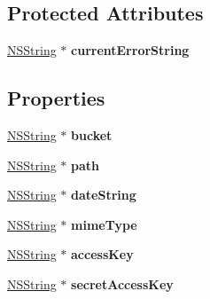 \subsection*{Protected Attributes}
\begin{DoxyCompactItemize}
\item 
\hypertarget{interface_a_s_i_s3_request_ae5a445cc590bdb2138a54c4b4b6544ea}{
\hyperlink{class_n_s_string}{NSString} $\ast$ {\bfseries currentErrorString}}
\label{interface_a_s_i_s3_request_ae5a445cc590bdb2138a54c4b4b6544ea}

\end{DoxyCompactItemize}
\subsection*{Properties}
\begin{DoxyCompactItemize}
\item 
\hypertarget{interface_a_s_i_s3_request_aef3ba2e285232e314b77c3e02cd64c0f}{
\hyperlink{class_n_s_string}{NSString} $\ast$ {\bfseries bucket}}
\label{interface_a_s_i_s3_request_aef3ba2e285232e314b77c3e02cd64c0f}

\item 
\hypertarget{interface_a_s_i_s3_request_ac7ee05e8dc699cc6149ad9e049823150}{
\hyperlink{class_n_s_string}{NSString} $\ast$ {\bfseries path}}
\label{interface_a_s_i_s3_request_ac7ee05e8dc699cc6149ad9e049823150}

\item 
\hypertarget{interface_a_s_i_s3_request_a2d2ae1919cf3ab5f06886ca2e112f9f4}{
\hyperlink{class_n_s_string}{NSString} $\ast$ {\bfseries dateString}}
\label{interface_a_s_i_s3_request_a2d2ae1919cf3ab5f06886ca2e112f9f4}

\item 
\hypertarget{interface_a_s_i_s3_request_a1d8154f777b756286ce21643e48de369}{
\hyperlink{class_n_s_string}{NSString} $\ast$ {\bfseries mimeType}}
\label{interface_a_s_i_s3_request_a1d8154f777b756286ce21643e48de369}

\item 
\hypertarget{interface_a_s_i_s3_request_a74852ee7d378a16b5b1f324864ce8a07}{
\hyperlink{class_n_s_string}{NSString} $\ast$ {\bfseries accessKey}}
\label{interface_a_s_i_s3_request_a74852ee7d378a16b5b1f324864ce8a07}

\item 
\hypertarget{interface_a_s_i_s3_request_a71538b6b917584e6d8e4e3dd638aa295}{
\hyperlink{class_n_s_string}{NSString} $\ast$ {\bfseries secretAccessKey}}
\label{interface_a_s_i_s3_request_a71538b6b917584e6d8e4e3dd638aa295}


\end{DoxyCompactItemize}
